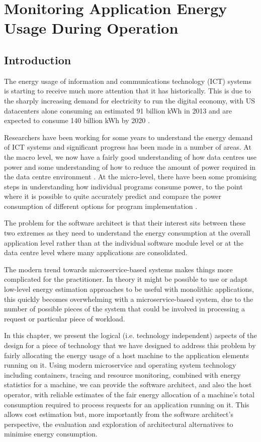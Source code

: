\chapter{Monitoring Application Energy Usage During Operation}


\section{Introduction}

The energy usage of information and communications technology (ICT) systems is starting to receive much more attention that it has historically.  This is due to the sharply increasing demand for electricity to run the digital economy, with US datacenters alone consuming an estimated 91 billion kWh in 2013 and are expected to consume 140 billion kWh by 2020 \cite{delforge2014-datacentreenergy}.

Researchers have been working for some years to understand the energy demand of ICT systems and significant progress has been made in a number of areas.  At the macro level, we now have a fairly good understanding of how data centres use power and some understanding of how to reduce the amount of power required in the data centre environment \cite{dc4cities2014_dcmetrics}.  At the micro-level, there have been some promising steps in understanding how individual programs consume power, to the point where it is possible to quite accurately predict and compare the power consumption of different options for program implementation \cite{islam2016-energysoftwarefeatures}.

The problem for the software architect is that their interest sits between these two extremes as they need to understand the energy consumption at the overall application level rather than at the individual software module level or at the data centre level where many applications are consolidated.

The modern trend towards microservice-based systems \cite{wikipedia_microservices} makes things more complicated for the practitioner.  In theory it might be possible to use or adapt low-level energy estimation approaches to be useful with monolithic applications, this quickly becomes overwhelming with a microservice-based system, due to the number of possible pieces of the system that could be involved in processing a request or particular piece of workload.

In this chapter, we present the logical (i.e. technology independent) aspects of the design for a piece of technology that we have designed to address this problem by fairly allocating the energy usage of a host machine to the application elements running on it.  Using modern microservice and operating system technology including containers, tracing and resource monitoring, combined with energy statistics for a machine, we can provide the software architect, and also the host operator, with reliable estimates of the fair energy allocation of a machine's total consumption required to process requests for an application running on it.  This allows cost estimation but, more importantly from the software architect's perspective, the evaluation and exploration of architectural alternatives to minimise energy consumption.

